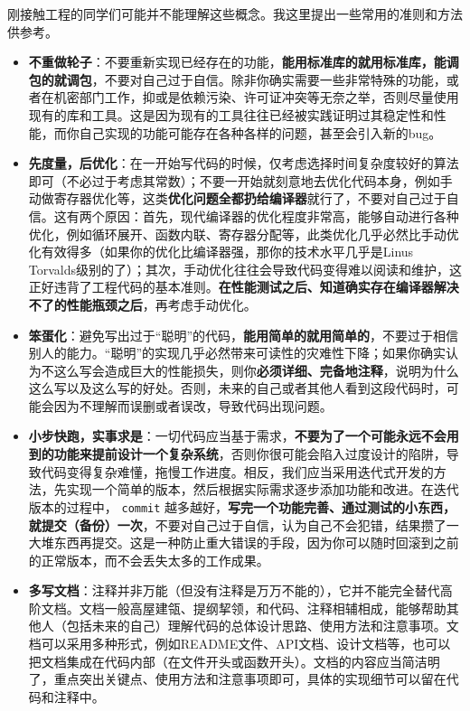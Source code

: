 刚接触工程的同学们可能并不能理解这些概念。我这里提出一些常用的准则和方法供参考。
\begin{itemize}
  \item \textbf{不重做轮子}：不要重新实现已经存在的功能，\textbf{能用标准库的就用标准库，能调包的就调包}，不要对自己过于自信。除非你确实需要一些非常特殊的功能，或者在机密部门工作，抑或是依赖污染、许可证冲突等无奈之举，否则尽量使用现有的库和工具。这是因为现有的工具往往已经被实践证明过其稳定性和性能，而你自己实现的功能可能存在各种各样的问题，甚至会引入新的bug。
  \item \textbf{先度量，后优化}：在一开始写代码的时候，仅考虑选择时间复杂度较好的算法即可（不必过于考虑其常数）；不要一开始就刻意地去优化代码本身，例如手动做寄存器优化等，这类\textbf{优化问题全都扔给编译器}就行了，不要对自己过于自信。这有两个原因：首先，现代编译器的优化程度非常高，能够自动进行各种优化，例如循环展开、函数内联、寄存器分配等，此类优化几乎必然比手动优化有效得多（如果你的优化比编译器强，那你的技术水平几乎是Linus Torvalds级别的了）；其次，手动优化往往会导致代码变得难以阅读和维护，这正好违背了工程代码的基本准则。\textbf{在性能测试之后、知道确实存在编译器解决不了的性能瓶颈之后}，再考虑手动优化。
  \item \textbf{笨蛋化}：避免写出过于“聪明”的代码，\textbf{能用简单的就用简单的}，不要过于相信别人的能力。“聪明”的实现几乎必然带来可读性的灾难性下降；如果你确实认为不这么写会造成巨大的性能损失，则你\textbf{必须详细、完备地注释}，说明为什么这么写以及这么写的好处。否则，未来的自己或者其他人看到这段代码时，可能会因为不理解而误删或者误改，导致代码出现问题。
  \item \textbf{小步快跑，实事求是}：一切代码应当基于需求，\textbf{不要为了一个可能永远不会用到的功能来提前设计一个复杂系统}，否则你很可能会陷入过度设计的陷阱，导致代码变得复杂难懂，拖慢工作进度。相反，我们应当采用迭代式开发的方法，先实现一个简单的版本，然后根据实际需求逐步添加功能和改进。在迭代版本的过程中， \texttt{commit} 越多越好，\textbf{写完一个功能完善、通过测试的小东西，就提交（备份）一次}，不要对自己过于自信，认为自己不会犯错，结果攒了一大堆东西再提交。这是一种防止重大错误的手段，因为你可以随时回滚到之前的正常版本，而不会丢失太多的工作成果。
  \item \textbf{多写文档}：注释并非万能（但没有注释是万万不能的），它并不能完全替代高阶文档。文档一般高屋建瓴、提纲挈领，和代码、注释相辅相成，能够帮助其他人（包括未来的自己）理解代码的总体设计思路、使用方法和注意事项。文档可以采用多种形式，例如README文件、API文档、设计文档等，也可以把文档集成在代码内部（在文件开头或函数开头）。文档的内容应当简洁明了，重点突出关键点、使用方法和注意事项即可，具体的实现细节可以留在代码和注释中。
\end{itemize}

